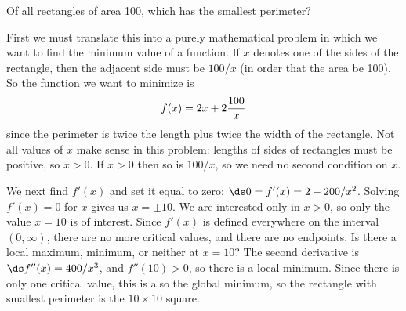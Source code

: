 \begin{example}
Of all rectangles of area 100, which has the smallest perimeter?

First we must translate this into a purely mathematical problem in
which we want to find the minimum value of a function.
If $x$ denotes one of the sides of the rectangle, then the adjacent side
must be $100/x$ (in order that the area be 100).  So the function we want
to minimize is 
$$
  f(x)=2x+2{100\over x}
$$
since the perimeter is twice the length plus twice the width of the
rectangle. Not all values of $x$ make sense in this problem: lengths
of sides of rectangles must be positive, so $x>0$. If $x>0$ then so is
$100/x$, so we need no second condition on $x$.

We next find $f'(x)$ and set it equal to zero: $\ds 0=f'(x)=2-200/x^2$.
Solving $f'(x)=0$ for $x$ gives us $x=\pm 10$. We are interested only
in $x>0$, so only the value $x=10$ is of interest. Since $f'(x)$ is
defined everywhere on the interval $(0,\infty)$, there are no more
critical values, and there are no endpoints. Is there a local maximum,
minimum, or neither at $x=10$? The second derivative is
$\ds f''(x)=400/x^3$, and $f''(10)>0$, so there is a local minimum. Since
there is only one critical value, this is also the global minimum, so the
rectangle with smallest perimeter is the $10\times10$ square.
\end{example}

